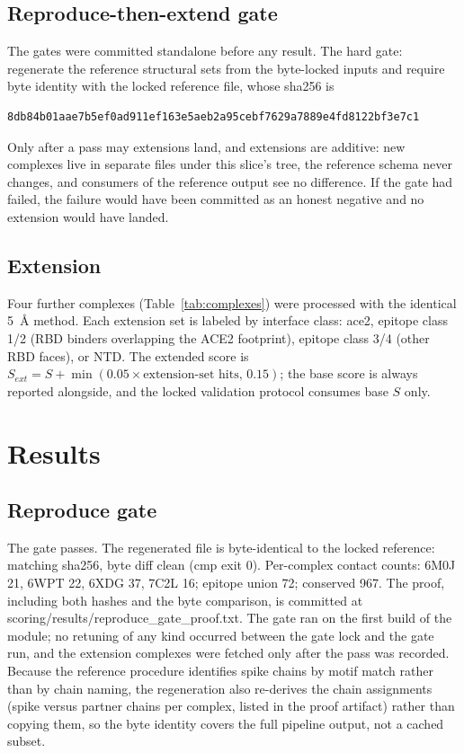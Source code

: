 \documentclass[11pt]{article}
\begin{document}
\subsection{Reproduce-then-extend gate}
The gates were committed standalone before any result. The hard gate: regenerate the reference structural sets from the byte-locked inputs and require byte identity with the locked reference file, whose sha256 is
{\scriptsize\begin{verbatim}8db84b01aae7b5ef0ad911ef163e5aeb2a95cebf7629a7889e4fd8122bf3e7c1\end{verbatim}} Only after a pass may extensions land, and extensions are additive: new complexes live in separate files under this slice's tree, the reference schema never changes, and consumers of the reference output see no difference. If the gate had failed, the failure would have been committed as an honest negative and no extension would have landed.

\subsection{Extension}
Four further complexes (Table~\ref{tab:complexes}) were processed with the identical 5~\AA{} method. Each extension set is labeled by interface class: ace2, epitope class 1/2 (RBD binders overlapping the ACE2 footprint), epitope class 3/4 (other RBD faces), or NTD. The extended score is $S_{ext} = S + \min(0.05 \times \text{extension-set hits},\,0.15)$; the base score is always reported alongside, and the locked validation protocol consumes base $S$ only.

\section{Results}
\subsection{Reproduce gate}
The gate passes. The regenerated file is byte-identical to the locked reference: matching sha256, byte diff clean (cmp exit 0). Per-complex contact counts: 6M0J 21, 6WPT 22, 6XDG 37, 7C2L 16; epitope union 72; conserved 967. The proof, including both hashes and the byte comparison, is committed at scoring/results/reproduce\_gate\_proof.txt. The gate ran on the first build of the module; no retuning of any kind occurred between the gate lock and the gate run, and the extension complexes were fetched only after the pass was recorded. Because the reference procedure identifies spike chains by motif match rather than by chain naming, the regeneration also re-derives the chain assignments (spike versus partner chains per complex, listed in the proof artifact) rather than copying them, so the byte identity covers the full pipeline output, not a cached subset.
\end{document}
